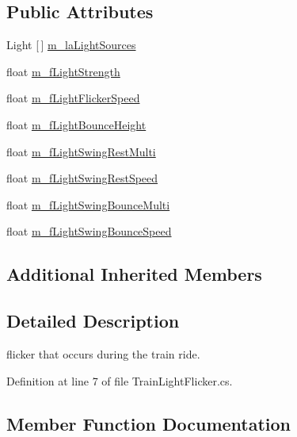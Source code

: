 \subsection*{Public Attributes}
\begin{DoxyCompactItemize}
\item 
Light \mbox{[}$\,$\mbox{]} \mbox{\hyperlink{class_train_light_flicker_aceadbf86286c91a0ef5d012c3797673e}{m\+\_\+la\+Light\+Sources}}
\item 
float \mbox{\hyperlink{class_train_light_flicker_a7c5ea1e800db0b531cd36de5571523cc}{m\+\_\+f\+Light\+Strength}}
\item 
float \mbox{\hyperlink{class_train_light_flicker_a86e9498a58d22c855f82e61755bc17e9}{m\+\_\+f\+Light\+Flicker\+Speed}}
\item 
float \mbox{\hyperlink{class_train_light_flicker_ab56c1f6b2cff3958948f9b0bb07217bd}{m\+\_\+f\+Light\+Bounce\+Height}}
\item 
float \mbox{\hyperlink{class_train_light_flicker_a7a9aa2adac19c5b3b838512e20e36e85}{m\+\_\+f\+Light\+Swing\+Rest\+Multi}}
\item 
float \mbox{\hyperlink{class_train_light_flicker_a9ade3913cc9e227efc96664d970aa660}{m\+\_\+f\+Light\+Swing\+Rest\+Speed}}
\item 
float \mbox{\hyperlink{class_train_light_flicker_a0c10768488824a764b182d0b8c630f64}{m\+\_\+f\+Light\+Swing\+Bounce\+Multi}}
\item 
float \mbox{\hyperlink{class_train_light_flicker_a3d7ac8eeeeb22f4a0cd0a14df5767f06}{m\+\_\+f\+Light\+Swing\+Bounce\+Speed}}
\end{DoxyCompactItemize}
\subsection*{Additional Inherited Members}


\subsection{Detailed Description}
flicker that occurs during the train ride. 



Definition at line 7 of file Train\+Light\+Flicker.\+cs.



\subsection{Member Function Documentation}
\mbox{\label{class_train_light_flicker_a56fcd413440a84b2974c8c37df9b8119}} 
